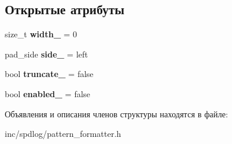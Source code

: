 \subsection*{Открытые атрибуты}
\begin{DoxyCompactItemize}
\item 
\mbox{\label{structspdlog_1_1details_1_1padding__info_afe275f65c0a28ca79281c7a7fa7904a7}} 
size\+\_\+t {\bfseries width\+\_\+} = 0
\item 
\mbox{\label{structspdlog_1_1details_1_1padding__info_aa9bbdfd8bdf7a470308793ea403ddbab}} 
pad\+\_\+side {\bfseries side\+\_\+} = left
\item 
\mbox{\label{structspdlog_1_1details_1_1padding__info_ae5795fe3248af99462b2ac324b3bccf8}} 
bool {\bfseries truncate\+\_\+} = false
\item 
\mbox{\label{structspdlog_1_1details_1_1padding__info_a67b732cf9e5c32a61f2a939dce5dd582}} 
bool {\bfseries enabled\+\_\+} = false
\end{DoxyCompactItemize}


Объявления и описания членов структуры находятся в файле\+:\begin{DoxyCompactItemize}
\item 
inc/spdlog/pattern\+\_\+formatter.\+h\end{DoxyCompactItemize}
